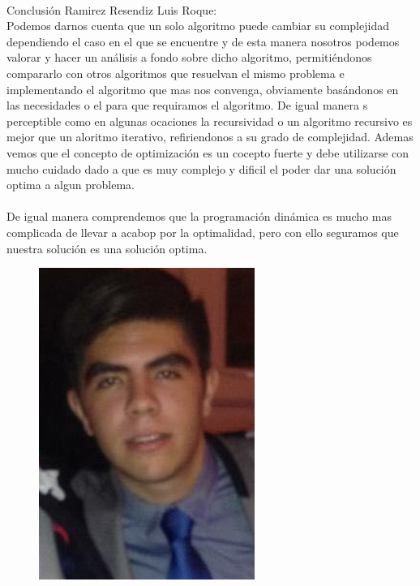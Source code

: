 \documentclass[12pt,twoside]{article}
\begin{document}
\\
Conclusión Ramirez Resendiz Luis Roque:\\
Podemos darnos cuenta que un solo algoritmo puede cambiar su complejidad dependiendo el caso en el que se encuentre y de esta manera nosotros podemos valorar y hacer un análisis a fondo sobre dicho algoritmo, permitiéndonos compararlo con otros algoritmos que resuelvan el mismo problema e implementando el algoritmo que mas nos convenga, obviamente basándonos en las necesidades o el para que requiramos el algoritmo. De igual manera s perceptible como en algunas ocaciones la recursividad o un algoritmo recursivo es mejor que un aloritmo iterativo, refiriendonos a su grado de complejidad. Ademas vemos que el concepto de optimización es un cocepto fuerte y debe utilizarse con mucho cuidado dado a que es muy complejo y dificil el poder dar una solución optima a algun problema.
\\
\\
De igual manera comprendemos que la programación dinámica es mucho mas complicada de llevar a acabop por la optimalidad, pero con ello seguramos que nuestra solución es una solución optima.
\begin{figure}[h!]
\centering
\includegraphics[scale=0.4]{luis1.jpg}
\caption{}
\label{fig:universe}
\end{figure}
\clearpage
\end{document}
